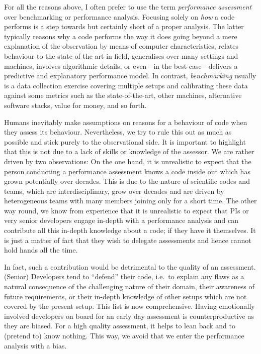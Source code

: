 

For all the reasons above, I often prefer to use the term \emph{performance assessment} over benchmarking or performance analysis.
Focusing solely on \emph{how} a code performs is a step towards but certainly short of a proper analysis.
The latter typically reasons why a code performs the way it does going beyond a mere explanation of the observation by means of computer characteristics, relates behaviour to the state-of-the-art in field, generalises over many settings and machines, involves algorithmic details, or even---in the best-case---delivers a predictive and explanatory performance model.
In contrast, \emph{benchmarking} usually is a data collection exercise covering multiple setups and calibrating these data against some metrics such as the state-of-the-art, other machines, alternative software stacks, value for money, and so forth.


Humans inevitably make assumptions on reasons for a behaviour of code when they assess its behaviour.
Nevertheless, we try to rule this out as much as possible and stick purely to the observational side.
It is important to highlight that this is not due to a lack of skills or knowledge of the assessor.
We are rather driven by two observations:
On the one hand, it is unrealistic to expect that the person conducting a performance assessment knows a code inside out which has grown potentially over decades.
This is due to the  nature of scientific codes and teams, which are interdisciplinary, grow over decades and are driven by heterogeneous teams with many members joining only for a short time.
The other way round, we know from experience that it is unrealistic to expect that PIs or very senior developers engage in-depth with a performance analysis and can contribute all this in-depth knowledge about a code; if they have it themselves.
It is just a matter of fact that they wish to delegate assessments and hence cannot hold hands all the time.

In fact, such a contribution would be detrimental to the quality of an
assessment.
(Senior) Developers tend to ``defend'' their code, i.e.~to explain any flaws as a natural
consequence of the challenging nature of their domain, their awareness of future
requirements, or their in-depth knowledge of other setups which are not covered
by the present setup.
This list is now comprehensive.
Having emotionally involved developers on board for an early day assessment is
counterproductive as they are biased.
For a high quality assessment, it helps to lean back and to (pretend to) know nothing.
This way, we avoid that we enter the performance analysis with a bias. 
